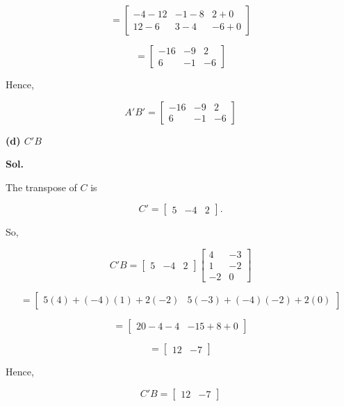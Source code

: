 \documentclass[12pt]{article}
\begin{document}
\[
=
\begin{bmatrix}
-4-12 & -1-8 & 2+0\\
12-6 & 3-4 & -6+0
\end{bmatrix}
\]

\[
=
\begin{bmatrix}
-16 & -9 & 2\\
6 & -1 & -6
\end{bmatrix}
\]

Hence,

\[
\boxed{
A'B'
=
\begin{bmatrix}
-16 & -9 & 2\\
6 & -1 & -6
\end{bmatrix}
}
\]

\vspace{1cm}

\noindent
\textbf{(d) \(C'B\)}

\vspace{0.5cm}

\noindent
\textbf{Sol.}

\vspace{0.3cm}

\noindent
The transpose of \(C\) is

\[
C'
=
\begin{bmatrix}
5 & -4 & 2
\end{bmatrix}.
\]

\noindent
So,

\[
C'B
=
\begin{bmatrix}
5 & -4 & 2
\end{bmatrix}
\begin{bmatrix}
4 & -3\\
1 & -2\\
-2 & 0
\end{bmatrix}
\]

\[
=
\begin{bmatrix}
5(4)+(-4)(1)+2(-2)
&
5(-3)+(-4)(-2)+2(0)
\end{bmatrix}
\]

\[
=
\begin{bmatrix}
20-4-4 & -15+8+0
\end{bmatrix}
\]

\[
=
\begin{bmatrix}
12 & -7
\end{bmatrix}
\]

Hence,

\[
\boxed{
C'B=
\begin{bmatrix}
12 & -7
\end{bmatrix}
}
\]
\end{document}
